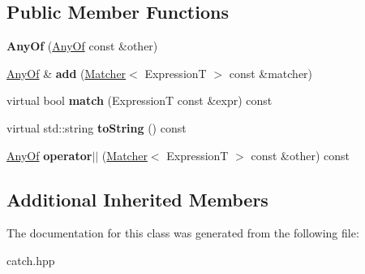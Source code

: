 \subsection*{Public Member Functions}
\begin{DoxyCompactItemize}
\item 
\mbox{\label{classCatch_1_1Matchers_1_1Impl_1_1Generic_1_1AnyOf_a74fbc05b32d334fcbfd0fae0163a404e}} 
{\bfseries Any\+Of} (\hyperlink{classCatch_1_1Matchers_1_1Impl_1_1Generic_1_1AnyOf}{Any\+Of} const \&other)
\item 
\mbox{\label{classCatch_1_1Matchers_1_1Impl_1_1Generic_1_1AnyOf_a3bce94b627551e5f96c5f9c6060413f0}} 
\hyperlink{classCatch_1_1Matchers_1_1Impl_1_1Generic_1_1AnyOf}{Any\+Of} \& {\bfseries add} (\hyperlink{structCatch_1_1Matchers_1_1Impl_1_1Matcher}{Matcher}$<$ ExpressionT $>$ const \&matcher)
\item 
\mbox{\label{classCatch_1_1Matchers_1_1Impl_1_1Generic_1_1AnyOf_adebd5437cdb8e0d54e16e97fe26e7e85}} 
virtual bool {\bfseries match} (ExpressionT const \&expr) const
\item 
\mbox{\label{classCatch_1_1Matchers_1_1Impl_1_1Generic_1_1AnyOf_a331aaf012b133682eadc9ed5342f848a}} 
virtual std\+::string {\bfseries to\+String} () const
\item 
\mbox{\label{classCatch_1_1Matchers_1_1Impl_1_1Generic_1_1AnyOf_a6dc9aee9a816f66ddc9de0c45c1c9ac1}} 
\hyperlink{classCatch_1_1Matchers_1_1Impl_1_1Generic_1_1AnyOf}{Any\+Of} {\bfseries operator$\vert$$\vert$} (\hyperlink{structCatch_1_1Matchers_1_1Impl_1_1Matcher}{Matcher}$<$ ExpressionT $>$ const \&other) const
\end{DoxyCompactItemize}
\subsection*{Additional Inherited Members}


The documentation for this class was generated from the following file\+:\begin{DoxyCompactItemize}
\item 
catch.\+hpp\end{DoxyCompactItemize}
